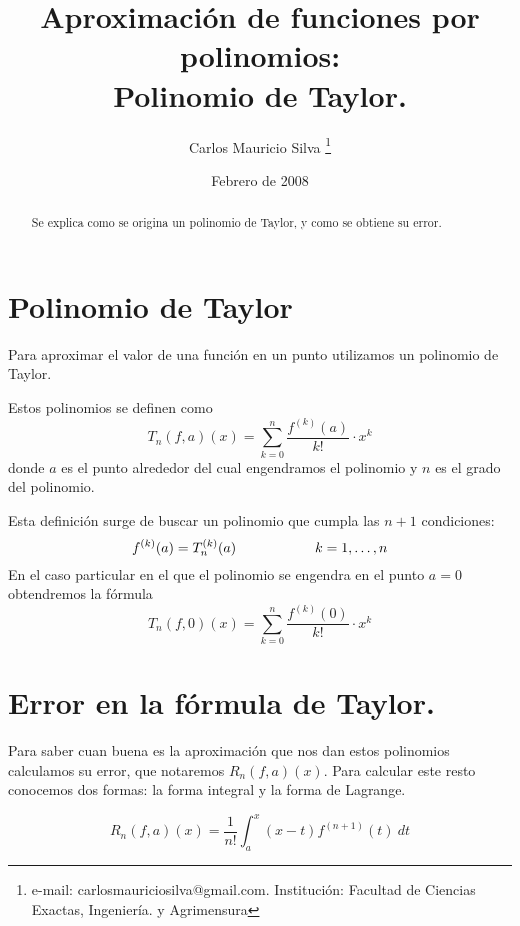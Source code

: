 \documentclass[a4paper, 12pt]{article}
\newcommand{\dire}[2]{\footnote{e-mail: {#1}. Institución: {#2}}}
\begin{document}
\renewcommand{\tablename}{Tabla}
\title{{\bfseries Aproximación de funciones por polinomios:}\\
Polinomio de Taylor.}
\author{Carlos Mauricio Silva \dire{carlosmauriciosilva@gmail.com}
{Facultad de Ciencias Exactas, Ingeniería. y Agrimensura}}
\date{\normalsize{Febrero de 2008}}
\maketitle

\begin{abstract}
Se explica como se origina un polinomio de Taylor, y como se obtiene su error.
\end{abstract}

\section{Polinomio de Taylor}
Para aproximar el valor de una función en un punto utilizamos un
polinomio de Taylor.

Estos polinomios se definen como
\begin{equation}
\label{eq:definicion}
T_{n}\left(f,a\right)\!\left(x\right)=
\sum_{k=0}^n\frac{f^{\left(k\right)}\!(a)}{k!}\cdot x^k
\end{equation}
donde $a$ es el punto alrededor del cual engendramos el polinomio
y $n$ es el grado del polinomio.

Esta definición surge de buscar un polinomio que cumpla las $n+1$
condiciones: $$f^{(k)}(a)=T_n^{(k)}(a)\hspace{20mm}k=1,\ldots,n$$
En el caso particular en el que el polinomio se engendra en el punto
$a=0$ obtendremos la fórmula
\begin{equation}
\label{eq:mclaurin}
T_{n}\left(f,0\right)\!\left(x\right)=
\sum_{k=0}^n\frac{f^{\left(k\right)}\!(0)}{k!}\cdot x^k
\end{equation}

\section {Error en la fórmula de Taylor.}
Para saber cuan buena es la aproximación que nos dan estos polinomios
calculamos su error, que notaremos
$R_{n}\left(f,a\right)\!\left(x\right)$.
Para calcular este resto conocemos dos formas:
la forma integral y la forma de Lagrange.

\begin{equation}
\label{eq:integral}
R_{n}\left(f,a\right)\!\left(x\right)=
\frac1{n!} \int_a^x\left(x-t\right)f^{\left(n+1\right)}\!(t)\ dt
\end{equation}
\end{document}
